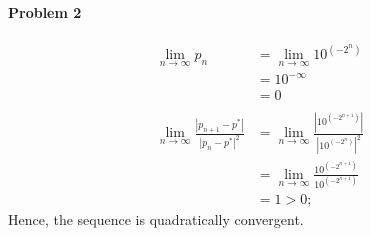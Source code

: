 \documentclass{article}
\begin{document}
\paragraph{Problem 2}
\begin{equation}\nonumber
\begin{split}
\lim_{n\to\infty}p_n &= \lim_{n\to\infty}10^{(-2^n)} \\
&= 10^{-\infty} \\
&= 0 \\~\\
\lim_{n\to\infty}\frac{|p_{n+1} - p^*|}{|p_n-p^*|^2} &=  \lim_{n\to\infty}\frac{|10^{(-2^{n+1})}|}{|10^{(-2^n)}|^2} \\
&= \lim_{n\to\infty}\frac{10^{(-2^{n+1})}}{10^{(-2^{n+1})}} \\
&= 1 > 0;
\end{split}
\end{equation}
Hence, the sequence is quadratically convergent.

\newpage
\end{document}

